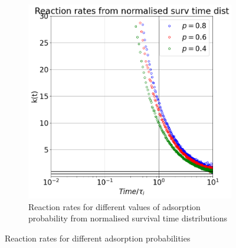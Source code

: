 \documentclass{article}
\begin{document}
\begin{figure}[htbp]
\begin{subfigure}[b]{0.45\textwidth}
        \includegraphics[width=\textwidth]{images/compareProbNormAdsRates.png}
        \caption{Reaction rates for different values of adsorption probability from normalised survival time distributions}
    \end{subfigure}
    \caption{Reaction rates for different adsorption probabilities}
    \label{fig:reactionRatesAdsProb}
\end{figure}

\FloatBarrier  %
\end{document}
